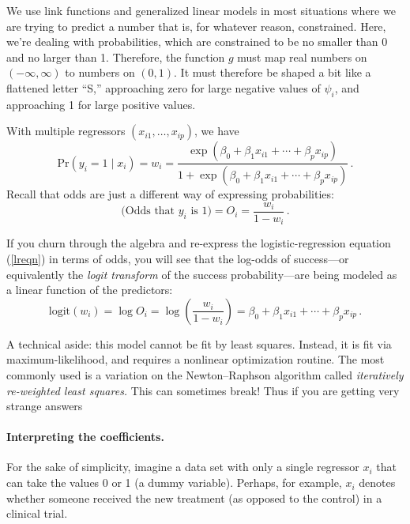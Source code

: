 \documentclass[11pt]{article}
\newcommand{\1}[1]{\mathbf{1}_{\{ {#1} \}}}
\begin{document}
We use link functions and generalized linear models in most situations where we are trying to predict a number that is, for whatever reason, constrained.  Here, we're dealing with probabilities, which are constrained to be no smaller than 0 and no larger than 1. Therefore, the function $g$ must map real numbers on $(-\infty, \infty)$ to numbers on $(0,1)$.  It must therefore be shaped a bit like a flattened letter ``S,'' approaching zero for large negative values of $\psi_i$, and approaching 1 for large positive values.

With multiple regressors $(x_{i1}, \ldots, x_{ip})$, we have
\begin{equation}
\label{lreqn}
\mbox{Pr}(y_i = 1  \mid x_i) = w_i = \frac{\exp(\beta_0 + \beta_1 x_{i1} + \cdots + \beta_p x_{ip})}
	{1+ \exp(\beta_0 + \beta_1 x_{i1} + \cdots + \beta_p x_{ip})} \, .
\end{equation}
Recall that odds are just a different way of expressing probabilities:
$$
\mbox{(Odds that $y_i$ is 1)} = O_i = \frac{w_i}{1-w_i} \, .
$$

If you churn through the algebra and re-express the logistic-regression equation (\ref{lreqn}) in terms of odds, you will see that the log-odds of success---or equivalently the \textit{logit transform} of the success probability---are being modeled as a linear function of the predictors:
$$
 \mbox{logit}(w_i)  = \log O_i = \log \left( \frac{w_i}{1-w_i } \right) = \beta_0 + \beta_1 x_{i1} + \cdots + \beta_p x_{ip} \, .
$$

A technical aside: this model cannot be fit by least squares.  Instead, it is fit via maximum-likelihood, and requires a nonlinear optimization routine.  The most commonly used is a variation on the Newton--Raphson algorithm called \textit{iteratively re-weighted least squares.}  This can sometimes break!  Thus if you are getting very strange answers

\paragraph{Interpreting the coefficients.}  For the sake of simplicity, imagine a data set with only a single regressor $x_i$ that can take the values 0 or 1 (a dummy variable).  Perhaps, for example, $x_i$ denotes whether someone received the new treatment (as opposed to the control) in a clinical trial.
\end{document}
